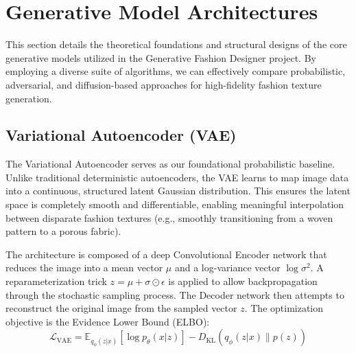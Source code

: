 \documentclass[12pt,a4paper]{article}
\begin{document}
\section{Generative Model Architectures}

This section details the theoretical foundations and structural designs of the core generative models utilized in the Generative Fashion Designer project. By employing a diverse suite of algorithms, we can effectively compare probabilistic, adversarial, and diffusion-based approaches for high-fidelity fashion texture generation.

\subsection{Variational Autoencoder (VAE)}
The Variational Autoencoder serves as our foundational probabilistic baseline. Unlike traditional deterministic autoencoders, the VAE learns to map image data into a continuous, structured latent Gaussian distribution. This ensures the latent space is completely smooth and differentiable, enabling meaningful interpolation between disparate fashion textures (e.g., smoothly transitioning from a woven pattern to a porous fabric).

The architecture is composed of a deep Convolutional Encoder network that reduces the image into a mean vector $\mu$ and a log-variance vector $\log\sigma^2$. A reparameterization trick $z = \mu + \sigma \odot \epsilon$ is applied to allow backpropagation through the stochastic sampling process. The Decoder network then attempts to reconstruct the original image from the sampled vector $z$. The optimization objective is the Evidence Lower Bound (ELBO):
\begin{equation}
    \mathcal{L}_{\text{VAE}} = \mathbb{E}_{q_\phi(z|x)}[\log p_\theta(x|z)] - D_{\text{KL}}(q_\phi(z|x) \| p(z))
\end{equation}
\end{document}
